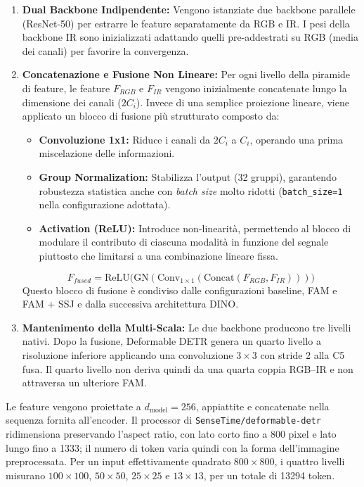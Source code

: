 \documentclass[a4paper,11pt]{article}
\begin{document}
\begin{enumerate}
    \item \textbf{Dual Backbone Indipendente:} Vengono istanziate due backbone parallele (ResNet-50) per estrarre le feature separatamente da RGB e IR. I pesi della backbone IR sono inizializzati adattando quelli pre-addestrati su RGB (media dei canali) per favorire la convergenza.
    \item \textbf{Concatenazione e Fusione Non Lineare:} Per ogni livello della piramide di feature, le feature $F_{RGB}$ e $F_{IR}$ vengono inizialmente concatenate lungo la dimensione dei canali ($2C_i$). Invece di una semplice proiezione lineare, viene applicato un blocco di fusione più strutturato composto da:
    \begin{itemize}
        \item \textbf{Convoluzione 1x1:} Riduce i canali da $2C_i$ a $C_i$, operando una prima miscelazione delle informazioni.
        \item \textbf{Group Normalization:} Stabilizza l'output (32 gruppi), garantendo robustezza statistica anche con \textit{batch size} molto ridotti (\texttt{batch\_size=1} nella configurazione adottata).
        \item \textbf{Activation (ReLU):} Introduce non-linearità, permettendo al blocco di modulare il contributo di ciascuna modalità in funzione del segnale piuttosto che limitarsi a una combinazione lineare fissa.
    \end{itemize}
    $$ F_{fused} = \text{ReLU}\big(\text{GN}(\text{Conv}_{1\times1}(\text{Concat}(F_{RGB}, F_{IR})))\big) $$
    Questo blocco di fusione è condiviso dalle configurazioni baseline, FAM e FAM + SSJ e dalla successiva architettura DINO.
    \item \textbf{Mantenimento della Multi-Scala:} Le due backbone producono tre livelli nativi. Dopo la fusione, Deformable DETR genera un quarto livello a risoluzione inferiore applicando una convoluzione $3\times3$ con stride 2 alla C5 fusa. Il quarto livello non deriva quindi da una quarta coppia RGB--IR e non attraversa un ulteriore FAM.
\end{enumerate}

Le feature vengono proiettate a $d_{\mathrm{model}}=256$, appiattite e concatenate nella sequenza fornita all'encoder. Il processor di \texttt{SenseTime/deformable-detr} ridimensiona preservando l'aspect ratio, con lato corto fino a 800 pixel e lato lungo fino a 1333; il numero di token varia quindi con la forma dell'immagine preprocessata. Per un input effettivamente quadrato $800\times800$, i quattro livelli misurano $100\times100$, $50\times50$, $25\times25$ e $13\times13$, per un totale di 13294 token.
\end{document}
